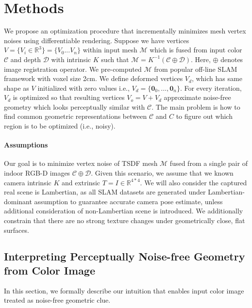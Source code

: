 \section{Methods}

We propose an optimization procedure that incrementally minimizes mesh vertex noises using differentiable rendering. 
Suppose we have vertices $V=\{V_i\in\mathbb{R}^3\}=\{V_0...V_n\}$ within input mesh $\mathcal{M}$ which is fused from input color $\mathcal{C}$ and depth $\mathcal{D}$ with intrinsic $K$ such that $\mathcal{M}=K^{-1}\left(\mathcal{C}\oplus \mathcal{D}\right)$. 
Here, $\oplus$ denotes image registration operator.
We pre-computed $\mathcal{M}$ from popular off-line SLAM framework \cite{zhou2018open3d} with voxel size 2cm.
We define deformed vertices $V_d$, which has same shape as $V$ initialized with zero values i.e., $V_d=\{\mathbf{0}_0,...,\mathbf{0}_n\}$. 
For every iteration, $V_d$ is optimized so that resulting vertices $V_o=V+V_d$ approximate noise-free geometry which looks perceptually similar with $\mathcal{C}$. 
The main problem is how to find common geometric representations between $\mathcal{C}$ and $C$ to figure out which region is to be optimized (i.e., noisy).

\paragraph{Assumptions}
Our goal is to minimize vertex noise of TSDF mesh $\mathcal{M}$ fused from a single pair of indoor RGB-D images $\mathcal{C}\oplus \mathcal{D}$. Given this scenario, we assume that we known camera intrinsic $K$ and extrinsic $T=I\in\mathbb{R}^{4*4}$. 
We will also consider the captured real scene is Lambertian, as all SLAM datasets are generated under Lambertian-dominant assumption to guarantee accurate camera pose estimate, unless additional consideration of non-Lambertian scene is introduced. 
We additionally constrain that there are no strong texture changes under geometrically close, flat surfaces. 

\subsection{Interpreting Perceptually Noise-free Geometry from Color Image}
In this section, we formally describe our intuition that enables input color image treated as noise-free geometric clue.

